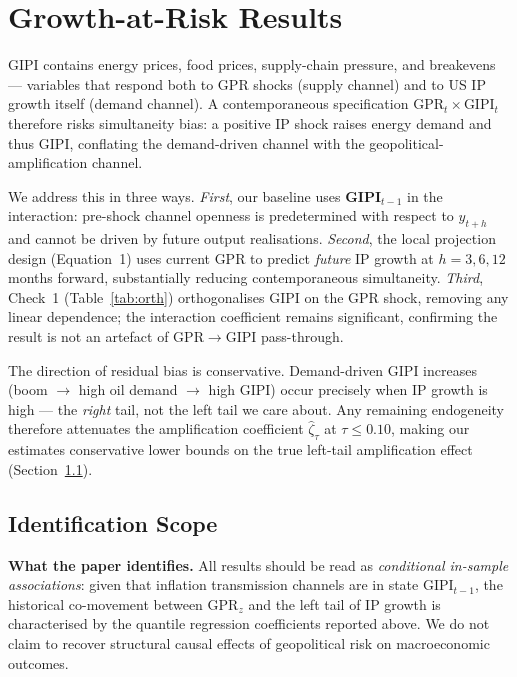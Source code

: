 \documentclass[12pt]{article}
\begin{document}
\section{Growth-at-Risk Results}\label{sec:gar}

GIPI contains energy prices, food prices, supply-chain pressure,
and breakevens --- variables that respond both to GPR shocks (supply
channel) and to US IP growth itself (demand channel).
A contemporaneous specification $\text{GPR}_t \times \text{GIPI}_t$ therefore
risks simultaneity bias: a positive IP shock raises energy demand and thus
GIPI, conflating the demand-driven channel with the geopolitical-amplification
channel.

We address this in three ways.
\textit{First}, our baseline uses \textbf{GIPI$_{t-1}$} in the interaction:
pre-shock channel openness is predetermined with respect to $y_{t+h}$
and cannot be driven by future output realisations.
\textit{Second}, the local projection design (Equation~1) uses current GPR
to predict \textit{future} IP growth at $h = 3, 6, 12$ months forward,
substantially reducing contemporaneous simultaneity.
\textit{Third}, Check~1 (Table~\ref{tab:orth}) orthogonalises GIPI on the
GPR shock, removing any linear dependence; the interaction coefficient
remains significant, confirming the result is not an artefact of
GPR$\to$GIPI pass-through.

The direction of residual bias is conservative.
Demand-driven GIPI increases (boom $\to$ high oil demand $\to$ high GIPI)
occur precisely when IP growth is high --- the \textit{right} tail, not the
left tail we care about.
Any remaining endogeneity therefore attenuates the amplification coefficient
$\hat\zeta_\tau$ at $\tau \leq 0.10$, making our estimates
conservative lower bounds on the true left-tail amplification effect
(Section~\ref{sec:iv}).

\subsection{Identification Scope}
\label{sec:iv}

\noindent\textbf{What the paper identifies.}
All results should be read as \textit{conditional in-sample associations}:
given that inflation transmission channels are in state GIPI$_{t-1}$,
the historical co-movement between GPR$_z$ and the left tail of IP growth
is characterised by the quantile regression coefficients reported above.
We do not claim to recover structural causal effects of geopolitical risk
on macroeconomic outcomes.
\end{document}
